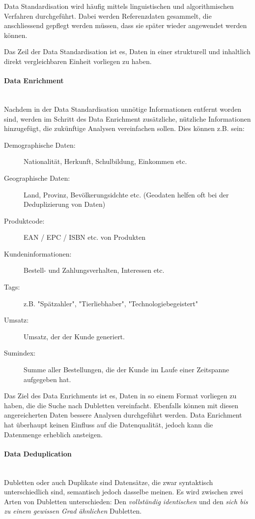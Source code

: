 \documentclass[a4paper, 11pt, nofootinbib]{article}
\begin{document}
Data Standardisation wird häufig mittels linguistischen und algorithmischen Verfahren durchgeführt. Dabei werden Referenzdaten gesammelt, die anschliessend gepflegt werden müssen, dass sie später wieder angewendet werden können.

Das Zeil der Data Standardisation ist es, Daten in einer strukturell und inhaltlich direkt vergleichbaren Einheit vorliegen zu haben.

\paragraph{Data Enrichment}\mbox{}\\
Nachdem in der Data Standardisation unnötige Informationen entfernt worden sind, werden im Schritt des Data Enrichment zusätzliche, nützliche Informationen hinzugefügt, die zukünftige Analysen vereinfachen sollen. Dies können z.B. sein:

\begin{description}
	\item[Demographische Daten: ] Nationalität, Herkunft, Schulbildung, Einkommen etc.
	\item[Geographische Daten: ] Land, Provinz, Bevölkerungsidchte etc. (Geodaten helfen oft bei der Deduplizierung von Daten)
	\item[Produktcode: ] EAN / EPC / ISBN etc. von Produkten
	\item[Kundeninformationen: ] Bestell- und Zahlungsverhalten, Interessen etc.
	\item[Tags: ] z.B. "Spätzahler", "Tierliebhaber", "Technologiebegeistert"
	\item[Umsatz: ] Umsatz, der der Kunde generiert.
	\item[Sumindex: ] Summe aller Bestellungen, die der Kunde im Laufe einer Zeitspanne aufgegeben hat.
\end{description}

Das Ziel des Data Enrichments ist es, Daten in so einem Format vorliegen zu haben, die die Suche nach Dubletten vereinfacht. Ebenfalls können mit diesen angereicherten Daten bessere Analysen durchgeführt werden. Data Enrichment hat überhaupt keinen Einfluss auf die Datenqualität, jedoch kann die Datenmenge erheblich ansteigen.

\paragraph{Data Deduplication}\mbox{}\\
Dubletten oder auch Duplikate sind Datensätze, die zwar syntaktisch unterschiedlich sind, semantisch jedoch dasselbe meinen. Es wird zwischen zwei Arten von Dubletten unterschieden: Den \textit{vollständig identischen} und den \textit{sich bis zu einem gewissen Grad ähnlichen} Dubletten.
\end{document}
